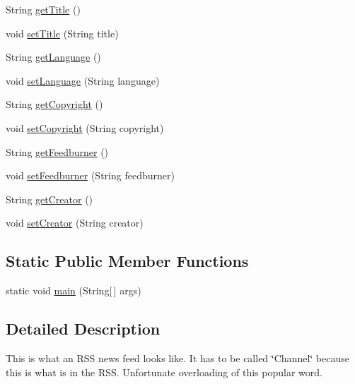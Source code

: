 \begin{DoxyCompactItemize}
\item 
String \hyperlink{classgov_1_1fnal_1_1ppd_1_1dd_1_1xml_1_1news_1_1Channel_ad58fef983eceeb0d606bca361d706501}{get\-Title} ()
\item 
void \hyperlink{classgov_1_1fnal_1_1ppd_1_1dd_1_1xml_1_1news_1_1Channel_a8cb48cb03f429be610b22266457f55be}{set\-Title} (String title)
\item 
String \hyperlink{classgov_1_1fnal_1_1ppd_1_1dd_1_1xml_1_1news_1_1Channel_a5c9e4ea139dfeefc22d4a3db9f4faec4}{get\-Language} ()
\item 
void \hyperlink{classgov_1_1fnal_1_1ppd_1_1dd_1_1xml_1_1news_1_1Channel_a388e4000e8d2912806e0fd9428d08c76}{set\-Language} (String language)
\item 
String \hyperlink{classgov_1_1fnal_1_1ppd_1_1dd_1_1xml_1_1news_1_1Channel_a3f42e0b6e326c05abd5bb341edd60ffb}{get\-Copyright} ()
\item 
void \hyperlink{classgov_1_1fnal_1_1ppd_1_1dd_1_1xml_1_1news_1_1Channel_a22f26f33069c0262649cb30b5bc5202b}{set\-Copyright} (String copyright)
\item 
String \hyperlink{classgov_1_1fnal_1_1ppd_1_1dd_1_1xml_1_1news_1_1Channel_adefc7eb7746fa74d5bda4f555f667344}{get\-Feedburner} ()
\item 
void \hyperlink{classgov_1_1fnal_1_1ppd_1_1dd_1_1xml_1_1news_1_1Channel_a9fc86bfa7a67dce90e2f9e2278821a78}{set\-Feedburner} (String feedburner)
\item 
String \hyperlink{classgov_1_1fnal_1_1ppd_1_1dd_1_1xml_1_1news_1_1Channel_a90fa6f945a81a1173402914edb759cba}{get\-Creator} ()
\item 
void \hyperlink{classgov_1_1fnal_1_1ppd_1_1dd_1_1xml_1_1news_1_1Channel_a38850ac66e22e0e8c9211821cb5a13f8}{set\-Creator} (String creator)
\end{DoxyCompactItemize}
\subsection*{Static Public Member Functions}
\begin{DoxyCompactItemize}
\item 
static void \hyperlink{classgov_1_1fnal_1_1ppd_1_1dd_1_1xml_1_1news_1_1Channel_a5ce9889ea4a8c5f5ec02a7e1337f912f}{main} (String\mbox{[}$\,$\mbox{]} args)
\end{DoxyCompactItemize}


\subsection{Detailed Description}
This is what an R\-S\-S news feed looks like. It has to be called \char`\"{}\-Channel\char`\"{} because this is what is in the R\-S\-S. Unfortunate overloading of this popular word.

